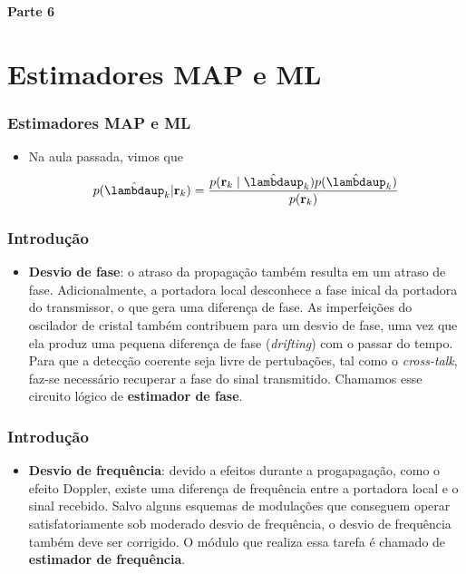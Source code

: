 
\begin{frame}
	\begin{block}{\centering\large\bfseries Parte 6}
		\centering\large\insertpart
	\end{block}
\end{frame}

\section{Estimadores MAP e ML}
\begin{frame}[t]
	\frametitle{Estimadores MAP e ML}
	
	\begin{itemize}
        \item Na aula passada, vimos que
        \begin{align}
            p(\hat{\boldsymbol{\lambdaup}}_k | \mathbf{r}_k) = \dfrac{p(\mathbf{r}_k \mid \hat{\boldsymbol{\lambdaup}}_k) p(\hat{\boldsymbol{\lambdaup}}_k)}{p(\mathbf{r}_k)}
        \end{align}
    \end{itemize}
\end{frame}

\begin{frame}[t]
	\frametitle{Introdução}
    \begin{itemize}
        \item \textbf{Desvio de fase}: o atraso da propagação também resulta em um atraso de fase. Adicionalmente, a portadora local desconhece a fase inical da portadora do transmissor, o que gera uma diferença de fase. As imperfeições do oscilador de cristal também contribuem para um desvio de fase, uma vez que ela produz uma pequena diferença de fase (\textit{drifting}) com o passar do tempo. Para que a detecção coerente seja livre de pertubações, tal como o \textit{cross-talk}, faz-se necessário recuperar a fase do sinal transmitido. Chamamos esse circuito lógico de \textbf{estimador de fase}. %
    \end{itemize}
\end{frame}

\begin{frame}[t]
	\frametitle{Introdução}
    \begin{itemize}
        \item \textbf{Desvio de frequência}: devido a efeitos durante a progapagação, como o efeito Doppler, existe uma diferença de frequência entre a portadora local e o sinal recebido. Salvo alguns esquemas de modulações que conseguem operar satisfatoriamente sob moderado desvio de frequência, o desvio de frequência também deve ser corrigido. O módulo que realiza essa tarefa é chamado de \textbf{estimador de frequência}.
    \end{itemize}
\end{frame}

